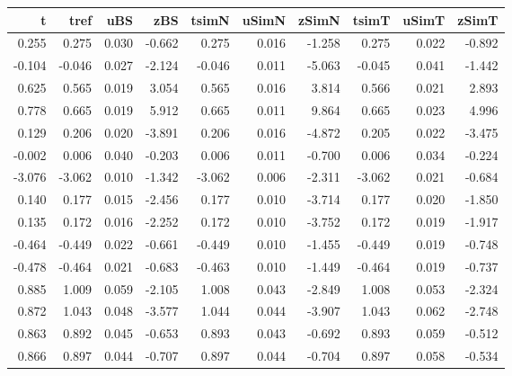
\begin{tabular}{r|r|r|r|r|r|r|r|r|r}
\hline
t & tref & uBS & zBS & tsimN & uSimN & zSimN & tsimT & uSimT & zSimT\\
\hline
0.255 & 0.275 & 0.030 & -0.662 & 0.275 & 0.016 & -1.258 & 0.275 & 0.022 & -0.892\\
\hline
-0.104 & -0.046 & 0.027 & -2.124 & -0.046 & 0.011 & -5.063 & -0.045 & 0.041 & -1.442\\
\hline
0.625 & 0.565 & 0.019 & 3.054 & 0.565 & 0.016 & 3.814 & 0.566 & 0.021 & 2.893\\
\hline
0.778 & 0.665 & 0.019 & 5.912 & 0.665 & 0.011 & 9.864 & 0.665 & 0.023 & 4.996\\
\hline
0.129 & 0.206 & 0.020 & -3.891 & 0.206 & 0.016 & -4.872 & 0.205 & 0.022 & -3.475\\
\hline
-0.002 & 0.006 & 0.040 & -0.203 & 0.006 & 0.011 & -0.700 & 0.006 & 0.034 & -0.224\\
\hline
-3.076 & -3.062 & 0.010 & -1.342 & -3.062 & 0.006 & -2.311 & -3.062 & 0.021 & -0.684\\
\hline
0.140 & 0.177 & 0.015 & -2.456 & 0.177 & 0.010 & -3.714 & 0.177 & 0.020 & -1.850\\
\hline
0.135 & 0.172 & 0.016 & -2.252 & 0.172 & 0.010 & -3.752 & 0.172 & 0.019 & -1.917\\
\hline
-0.464 & -0.449 & 0.022 & -0.661 & -0.449 & 0.010 & -1.455 & -0.449 & 0.019 & -0.748\\
\hline
-0.478 & -0.464 & 0.021 & -0.683 & -0.463 & 0.010 & -1.449 & -0.464 & 0.019 & -0.737\\
\hline
0.885 & 1.009 & 0.059 & -2.105 & 1.008 & 0.043 & -2.849 & 1.008 & 0.053 & -2.324\\
\hline
0.872 & 1.043 & 0.048 & -3.577 & 1.044 & 0.044 & -3.907 & 1.043 & 0.062 & -2.748\\
\hline
0.863 & 0.892 & 0.045 & -0.653 & 0.893 & 0.043 & -0.692 & 0.893 & 0.059 & -0.512\\
\hline
0.866 & 0.897 & 0.044 & -0.707 & 0.897 & 0.044 & -0.704 & 0.897 & 0.058 & -0.534\\
\hline
\end{tabular}
